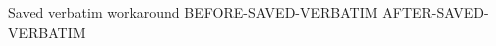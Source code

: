 \documentclass{pnpcards}
\begin{document}
\begin{card}{Saved verbatim workaround}
BEFORE-SAVED-VERBATIM
AFTER-SAVED-VERBATIM
\end{card}
\end{document}
